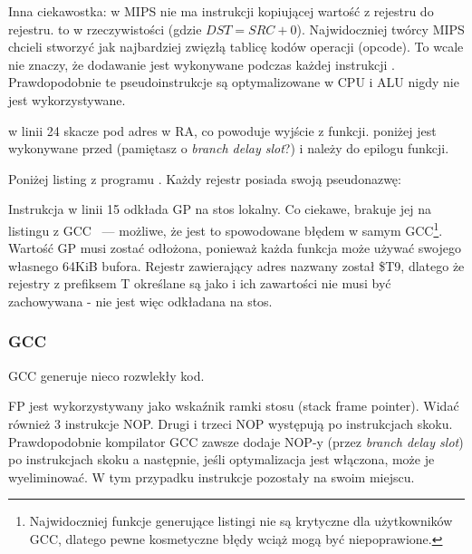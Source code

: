 Inna ciekawostka: w MIPS nie ma instrukcji kopiującej wartość z rejestru do rejestru.
 to w rzeczywistości  (gdzie $DST=SRC+0$).
Najwidoczniej twórcy MIPS chcieli stworzyć jak najbardziej zwięzłą tablicę kodów operacji (opcode).
To wcale nie znaczy, że dodawanie jest wykonywane podczas każdej instrukcji .
Prawdopodobnie te pseudoinstrukcje są optymalizowane w \ac{CPU} i \ac{ALU} nigdy nie jest wykorzystywane.

 w linii 24 skacze pod adres w \ac{RA}, co powoduje wyjście z funkcji.
 poniżej  jest wykonywane przed  (pamiętasz o \emph{branch delay slot}?) i należy do epilogu funkcji.

Poniżej listing z programu \IDA. Każdy rejestr posiada swoją pseudonazwę:



Instrukcja w linii 15 odkłada GP na stos lokalny. Co ciekawe, brakuje jej na listingu z GCC ~--- możliwe, że jest to spowodowane błędem w samym GCC\footnote{Najwidoczniej funkcje generujące listingi nie są krytyczne
dla użytkowników GCC, dlatego pewne kosmetyczne błędy wciąż mogą być niepoprawione.}.
Wartość GP musi zostać odłożona, ponieważ każda funkcja może używać swojego własnego 64KiB bufora.
Rejestr zawierający adres \puts nazwany został \$T9, dlatego że rejestry z prefiksem T określane są jako  i ich zawartości nie musi być zachowywana - nie jest więc odkładana na stos.

\subsubsection{\NonOptimizing GCC}

\NonOptimizing GCC generuje nieco rozwlekły kod.



FP jest wykorzystywany jako wskaźnik ramki stosu (stack frame pointer).
Widać również 3 instrukcje \ac{NOP}.
Drugi i trzeci \ac{NOP} występują po instrukcjach skoku.
Prawdopodobnie kompilator GCC zawsze dodaje \ac{NOP}-y (przez \emph{branch delay slot})
po instrukcjach skoku a następnie, jeśli optymalizacja jest włączona, może je wyeliminować.
W tym przypadku instrukcje pozostały na swoim miejscu.

